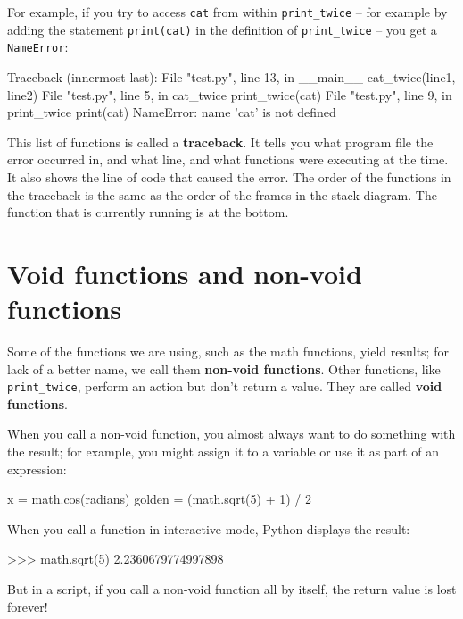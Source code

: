 For example, if you try to access {\tt cat} from within 
\verb"print_twice" -- for example by adding the statement {\tt print(cat)} in the definition of \verb"print_twice" -- you get a {\tt NameError}:

\beforeverb
\begin{pyinterpreter}
Traceback (innermost last):
  File "test.py", line 13, in __main__
    cat_twice(line1, line2)
  File "test.py", line 5, in cat_twice
    print_twice(cat)
  File "test.py", line 9, in print_twice
    print(cat)
NameError: name 'cat' is not defined
\end{pyinterpreter}
\afterverb
%
This list of functions is called a {\bf traceback}.  It tells you what
program file the error occurred in, and what line, and what functions
were executing at the time.  It also shows the line of code that
caused the error.
%
%
The order of the functions in the traceback is the same as the
order of the frames in the stack diagram.  The function that is
currently running is at the bottom.


\section{Void functions and non-void functions}


Some of the functions we are using, such as the math functions, yield
results; for lack of a better name, we call them {\bf non-void
  functions}.  Other functions, like \verb"print_twice", perform an
action but don't return a value.  They are called {\bf void
  functions}.

When you call a non-void function, you almost always
want to do something with the result; for example, you might
assign it to a variable or use it as part of an expression:

\beforeverb
\begin{pycode}
x = math.cos(radians)
golden = (math.sqrt(5) + 1) / 2
\end{pycode}
\afterverb
%
When you call a function in interactive mode, Python displays
the result:

\beforeverb
\begin{pyinterpreter}
>>> math.sqrt(5)
2.2360679774997898
\end{pyinterpreter}
\afterverb
%
But in a script, if you call a non-void function all by itself,
the return value is lost forever!

